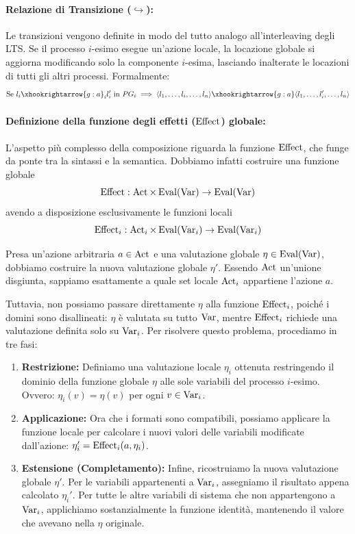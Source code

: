 \paragraph{Relazione di Transizione (\(\hookrightarrow\)):}
Le transizioni vengono definite in modo del tutto analogo all'interleaving degli LTS\@. Se il processo \(i\)-esimo esegue un'azione locale, la locazione globale si aggiorna modificando solo la componente \(i\)-esima, lasciando inalterate le locazioni di tutti gli altri processi. Formalmente:
\[
  \text{Se } l_i \xhookrightarrow{g:a}_i l_i' \text{ in } PG_i \implies \langle l_1, \ldots, l_i, \ldots, l_n \rangle \xhookrightarrow{g:a} \langle l_1, \ldots, l_i', \ldots, l_n \rangle
\]

\paragraph{Definizione della funzione degli effetti (\(\operatorname{Effect}\)) globale:}
L'aspetto più complesso della composizione riguarda la funzione \(\operatorname{Effect}\), che funge da ponte tra la sintassi e la semantica. Dobbiamo infatti costruire una funzione globale
\[ \operatorname{Effect} : \operatorname{Act} \times \operatorname{Eval}(\operatorname{Var}) \to \operatorname{Eval}(\operatorname{Var}) \]
avendo a disposizione esclusivamente le funzioni locali
\[ \operatorname{Effect}_i : \operatorname{Act}_i \times \operatorname{Eval}(\operatorname{Var}_i) \to \operatorname{Eval}(\operatorname{Var}_i) \]

Presa un'azione arbitraria \(a \in \operatorname{Act}\) e una valutazione globale \(\eta \in \operatorname{Eval}(\operatorname{Var})\), dobbiamo costruire la nuova valutazione globale \(\eta'\). Essendo \(\operatorname{Act}\) un'unione disgiunta, sappiamo esattamente a quale set locale \(\operatorname{Act}_i\) appartiene l'azione \(a\).

Tuttavia, non possiamo passare direttamente \(\eta\) alla funzione \(\operatorname{Effect}_i\), poiché i domini sono disallineati: \(\eta\) è valutata su tutto \(\operatorname{Var}\), mentre \(\operatorname{Effect}_i\) richiede una valutazione definita solo su \(\operatorname{Var}_i\).
Per risolvere questo problema, procediamo in tre fasi:
\begin{enumerate}
  \item \textbf{Restrizione:} Definiamo una valutazione locale \(\eta_i\) ottenuta restringendo il dominio della funzione globale \(\eta\) alle sole variabili del processo \(i\)-esimo. Ovvero: \(\eta_i(v) = \eta(v)\) per ogni \(v \in \operatorname{Var}_i\).
  \item \textbf{Applicazione:} Ora che i formati sono compatibili, possiamo applicare la funzione locale per calcolare i nuovi valori delle variabili modificate dall'azione: \(\eta_i' = \operatorname{Effect}_i(a, \eta_i)\).
  \item \textbf{Estensione (Completamento):} Infine, ricostruiamo la nuova valutazione globale \(\eta'\). Per le variabili appartenenti a \(\operatorname{Var}_i\), assegniamo il risultato appena calcolato \(\eta_i'\). Per tutte le altre variabili di sistema che non appartengono a \(\operatorname{Var}_i\), applichiamo sostanzialmente la funzione identità, mantenendo il valore che avevano nella \(\eta\) originale.
\end{enumerate}

